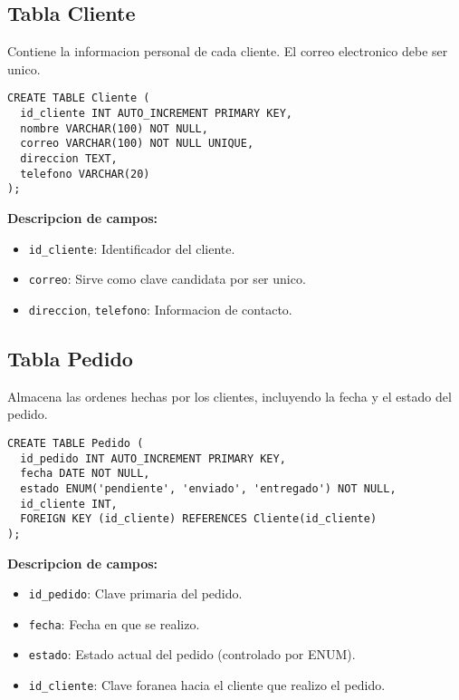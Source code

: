 \subsection{Tabla Cliente}

Contiene la informacion personal de cada cliente. El correo electronico debe ser unico.

\begin{lstlisting}
CREATE TABLE Cliente (
  id_cliente INT AUTO_INCREMENT PRIMARY KEY,
  nombre VARCHAR(100) NOT NULL,
  correo VARCHAR(100) NOT NULL UNIQUE,
  direccion TEXT,
  telefono VARCHAR(20)
);
\end{lstlisting}

\textbf{Descripcion de campos:}

\begin{itemize}
  \item \texttt{id\_cliente}: Identificador del cliente.
  \item \texttt{correo}: Sirve como clave candidata por ser unico.
  \item \texttt{direccion}, \texttt{telefono}: Informacion de contacto.
\end{itemize}

\subsection{Tabla Pedido}

Almacena las ordenes hechas por los clientes, incluyendo la fecha y el estado del pedido.

\begin{lstlisting}
CREATE TABLE Pedido (
  id_pedido INT AUTO_INCREMENT PRIMARY KEY,
  fecha DATE NOT NULL,
  estado ENUM('pendiente', 'enviado', 'entregado') NOT NULL,
  id_cliente INT,
  FOREIGN KEY (id_cliente) REFERENCES Cliente(id_cliente)
);
\end{lstlisting}

\textbf{Descripcion de campos:}

\begin{itemize}
  \item \texttt{id\_pedido}: Clave primaria del pedido.
  \item \texttt{fecha}: Fecha en que se realizo.
  \item \texttt{estado}: Estado actual del pedido (controlado por ENUM).
  \item \texttt{id\_cliente}: Clave foranea hacia el cliente que realizo el pedido.
\end{itemize}

